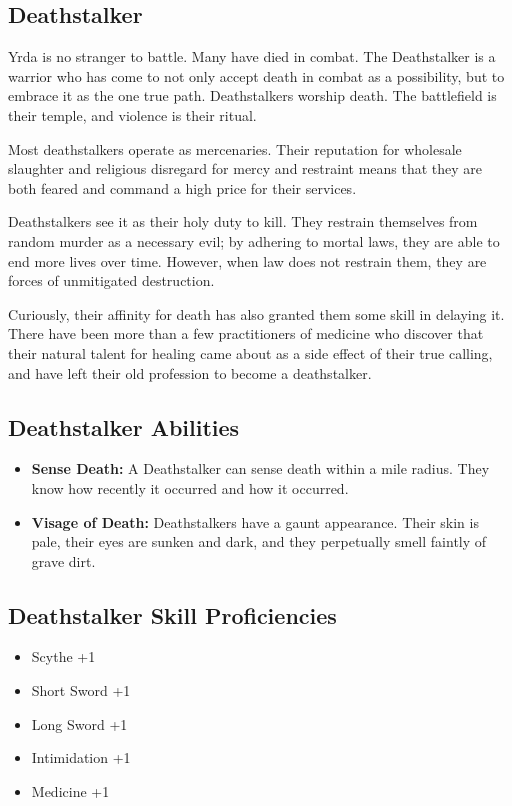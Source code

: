 \begin{multicols}{2}
\section{Deathstalker}

Yrda is no stranger to battle. Many have died in combat. The Deathstalker
is a warrior who has come to not only accept death in combat as a possibility,
but to embrace it as the one true path. Deathstalkers worship death. The
battlefield is their temple, and violence is their ritual.

Most deathstalkers operate as mercenaries. Their reputation for wholesale
slaughter and religious disregard for mercy and restraint means that they
are both feared and command a high price for their services.

Deathstalkers see it as their holy duty to kill. They restrain themselves
from random murder as a necessary evil; by adhering to mortal laws, they
are able to end more lives over time. However, when law does not restrain
them, they are forces of unmitigated destruction.

Curiously, their affinity for death has also granted them some skill in
delaying it. There have been more than a few practitioners of medicine
who discover that their natural talent for healing came about as a side
effect of their true calling, and have left their old profession to become
a deathstalker.

\subsection{Deathstalker Abilities}

\begin{itemize}
  \item \textbf{Sense Death:} A Deathstalker can sense death within a
    mile radius. They know how recently it occurred and how it occurred.
  \item \textbf{Visage of Death:} Deathstalkers have a gaunt appearance.
    Their skin is pale, their eyes are sunken and dark, and they perpetually
    smell faintly of grave dirt.
\end{itemize}

\subsection{Deathstalker Skill Proficiencies}

\begin{itemize}
  \item Scythe +1
  \item Short Sword +1
  \item Long Sword +1
  \item Intimidation +1
  \item Medicine +1
\end{itemize}


\end{multicols}

